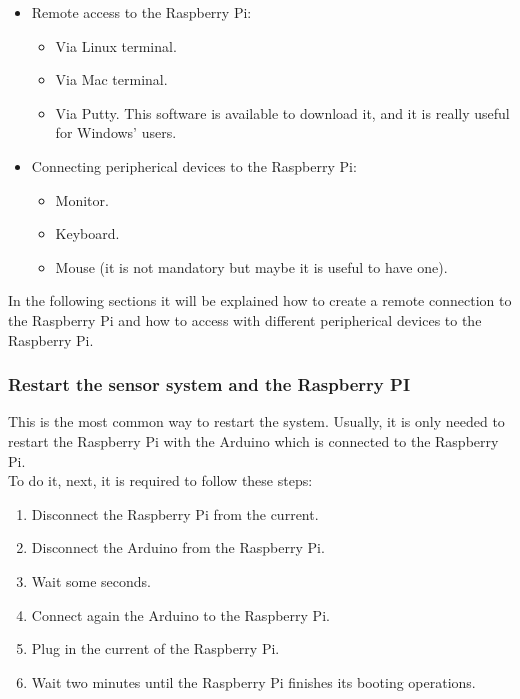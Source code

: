 \begin{itemize}
\item Remote access to the Raspberry Pi:
\begin{itemize}
\item Via Linux terminal.
\item Via Mac terminal.
\item Via Putty. This software is available to download it, and it is really useful for Windows’ users.
\end{itemize}
\item Connecting peripherical devices to the Raspberry Pi:
\begin{itemize}
\item Monitor.
\item Keyboard.
\item Mouse (it is not mandatory but maybe it is useful to have one).
\end{itemize}
\end{itemize}

In the following sections it will be explained how to create a remote connection to the Raspberry Pi and how to access with different peripherical devices to the Raspberry Pi.\\

\subsubsection{Restart the sensor system and the Raspberry PI}

This is the most common way to restart the system. Usually, it is only needed to restart the Raspberry Pi with the Arduino which is connected to the Raspberry Pi.\\

To do it, next, it is required to follow these steps:

\begin{enumerate}

\item Disconnect the Raspberry Pi from the current.
\item Disconnect the Arduino from the Raspberry Pi.
\item Wait some seconds.
\item Connect again the Arduino to the Raspberry Pi.
\item Plug in the current of the Raspberry Pi.
\item Wait two minutes until the Raspberry Pi finishes its booting operations.

\end{enumerate}

